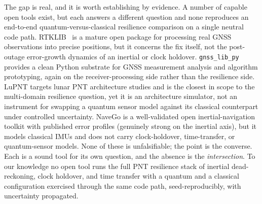 The gap is real, and it is worth establishing by evidence. A number of capable
open tools exist, but each answers a different question and
none reproduces an end-to-end quantum-versus-classical resilience comparison on a
single neutral code path. RTKLIB~\citep{takasu2009} is a mature open package for
processing real GNSS observations into precise positions, but it concerns the
fix itself, not the post-outage error-growth dynamics of an inertial or clock
holdover. \texttt{gnss\_lib\_py}~\citep{knowles2024gnsslibpy} provides a clean
Python substrate for GNSS measurement analysis and algorithm prototyping, again
on the receiver-processing side rather than the resilience side. LuPNT
\citep{iiyama2023lupnt} targets lunar PNT architecture studies and is the
closest in scope to the multi-domain resilience question, yet it is an
architecture simulator, not an instrument for swapping a quantum sensor model
against its classical counterpart under controlled uncertainty. NaveGo
\citep{gonzalez2017navego} is a well-validated open inertial-navigation toolkit
with published error profiles (genuinely strong on the inertial axis), but it
models classical IMUs and does not carry clock-holdover, time-transfer, or
quantum-sensor models. None of these is unfalsifiable; the point is the
converse. Each is a sound tool for its own question, and the absence is the
\emph{intersection}. To our knowledge no open tool runs the full PNT resilience
stack of inertial dead-reckoning, clock holdover, and time transfer with a
quantum and a classical configuration exercised through the same code path,
seed-reproducibly, with uncertainty propagated.

